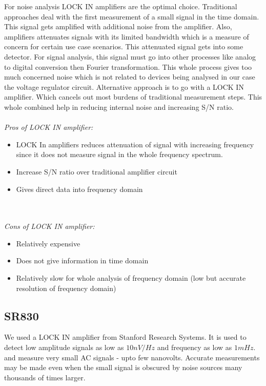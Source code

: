 For noise analysis LOCK IN amplifiers are the optimal choice. Traditional approaches deal with the first measurement of a small signal in the time domain. This signal gets amplified with additional noise from the amplifier. Also, amplifiers attenuates signals with its limited bandwidth which is a measure of concern for certain use case scenarios. This attenuated signal gets into some detector. For signal analysis, this signal must go into other  processes like analog to digital conversion then Fourier transformation. This whole process gives too much concerned noise which is not related to devices being analysed in our case the voltage regulator circuit. Alternative approach is to go with a LOCK IN amplifier. Which cancels out most burdens of traditional measurement steps. This whole combined help in reducing internal noise and increasing S/N ratio.
\\
\\
\emph{\large Pros of LOCK IN amplifier:}
\begin{itemize}
\item LOCK In amplifiers reduces attenuation of signal with increasing frequency since it does not measure signal in the whole frequency spectrum.
\item Increase S/N ratio over traditional amplifier circuit
\item Gives direct data into frequency domain
\end{itemize}\\
\\
\emph {\large Cons of LOCK IN amplifier:}
\begin{itemize}
\item Relatively expensive
\item Does not give information in time domain
\item Relatively slow for whole analysis of frequency domain (low but accurate resolution of frequency domain)
\end{itemize}

\subsection{SR830}

We used a LOCK IN amplifier from Stanford Research Systems. It is used to detect low amplitude signals as low as $10 nV/Hz$ and frequency as low as $1 mHz$.  and measure very small AC signals - upto few nanovolts. Accurate measurements may be made even when the small signal is obscured by noise sources many thousands of times larger.



